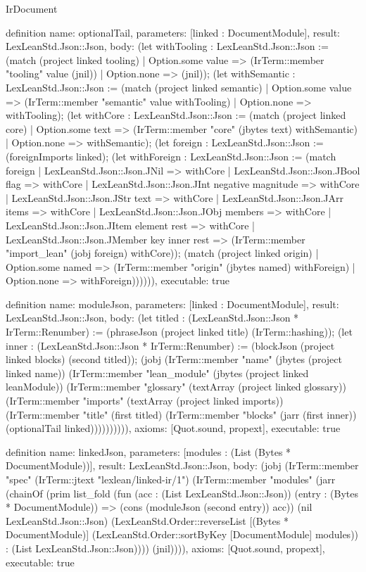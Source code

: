 \begin{lexlean}{IrDocument}
\begin{semanticmodule}
definition{
  name: optionalTail,
  parameters: [linked : DocumentModule],
  result: LexLeanStd.Json::Json,
  body: (let withTooling : LexLeanStd.Json::Json := (match (project linked tooling)
    | Option.some value => (IrTerm::member "tooling" value (jnil))
    | Option.none => (jnil)); (let withSemantic : LexLeanStd.Json::Json := (match (project linked semantic)
    | Option.some value => (IrTerm::member "semantic" value withTooling)
    | Option.none => withTooling); (let withCore : LexLeanStd.Json::Json := (match (project linked core)
    | Option.some text => (IrTerm::member "core" (jbytes text) withSemantic)
    | Option.none => withSemantic); (let foreign : LexLeanStd.Json::Json := (foreignImports linked); (let withForeign : LexLeanStd.Json::Json := (match foreign
    | LexLeanStd.Json::Json.JNil => withCore
    | LexLeanStd.Json::Json.JBool flag => withCore
    | LexLeanStd.Json::Json.JInt negative magnitude => withCore
    | LexLeanStd.Json::Json.JStr text => withCore
    | LexLeanStd.Json::Json.JArr items => withCore
    | LexLeanStd.Json::Json.JObj members => withCore
    | LexLeanStd.Json::Json.JItem element rest => withCore
    | LexLeanStd.Json::Json.JMember key inner rest => (IrTerm::member "import_lean" (jobj foreign) withCore)); (match (project linked origin)
    | Option.some named => (IrTerm::member "origin" (jbytes named) withForeign)
    | Option.none => withForeign)))))),
  executable: true
}

definition{
  name: moduleJson,
  parameters: [linked : DocumentModule],
  result: LexLeanStd.Json::Json,
  body: (let titled : (LexLeanStd.Json::Json * IrTerm::Renumber) := (phraseJson (project linked title) (IrTerm::hashing)); (let inner : (LexLeanStd.Json::Json * IrTerm::Renumber) := (blockJson (project linked blocks) (second titled)); (jobj (IrTerm::member "name" (jbytes (project linked name)) (IrTerm::member "lean_module" (jbytes (project linked leanModule)) (IrTerm::member "glossary" (textArray (project linked glossary)) (IrTerm::member "imports" (textArray (project linked imports)) (IrTerm::member "title" (first titled) (IrTerm::member "blocks" (jarr (first inner)) (optionalTail linked)))))))))),
  axioms: [Quot.sound, propext],
  executable: true
}

definition{
  name: linkedJson,
  parameters: [modules : (List (Bytes * DocumentModule))],
  result: LexLeanStd.Json::Json,
  body: (jobj (IrTerm::member "spec" (IrTerm::jtext "lexlean/linked-ir/1") (IrTerm::member "modules" (jarr (chainOf (prim list_fold (fun (acc : (List LexLeanStd.Json::Json)) (entry : (Bytes * DocumentModule)) => (cons (moduleJson (second entry)) acc)) (nil LexLeanStd.Json::Json) (LexLeanStd.Order::reverseList [(Bytes * DocumentModule)] (LexLeanStd.Order::sortByKey [DocumentModule] modules)) : (List LexLeanStd.Json::Json)))) (jnil)))),
  axioms: [Quot.sound, propext],
  executable: true
}


\end{semanticmodule}
\end{lexlean}

